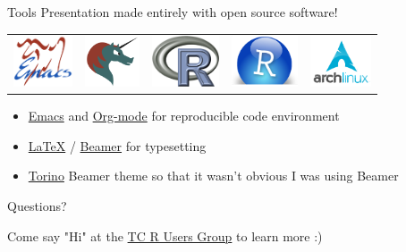 \documentclass[sans,aspectratio=169,presentation,bigger,fleqn]{beamer}
\begin{document}
\begin{frame}[label=sec-31]{Tools}
Presentation made entirely with open source software!

\begin{center}
\begin{center}
\begin{tabular}{lllll}
\includegraphics[height=1.5cm]{./img/emacs.png} & \includegraphics[height=1.5cm]{./img/org-mode.png} & \includegraphics[height=1.5cm]{./img/r.png} & \includegraphics[height=1.5cm]{./img/r-studio.png} & \includegraphics[height=1.5cm]{./img/arch.png}\\
\end{tabular}
\end{center}
\end{center}

\begin{itemize}
\item \href{http://www.gnu.org/software/emacs/}{Emacs} and \href{http://orgmode.org/}{Org-mode} for reproducible code environment
\item \href{http://www.latex-project.org/}{\LaTeX} / \href{http://www.ctan.org/tex-archive/macros/latex/contrib/beamer/}{Beamer} for typesetting
\item \href{http://blog.barisione.org/2007-09/torino-a-pretty-theme-for-latex-beamer/}{Torino} Beamer theme so that it wasn't obvious I was using Beamer
\end{itemize}
\end{frame}

\begin{frame}[label=sec-32]{}
\LARGE
\begin{center}
Questions?

\vspace{1.5cm}

\normalsize
Come say "Hi" at the \href{http://www.meetup.com/twincitiesrug/}{TC R Users Group} to learn more :)
\end{center}
\end{frame}
\end{document}
